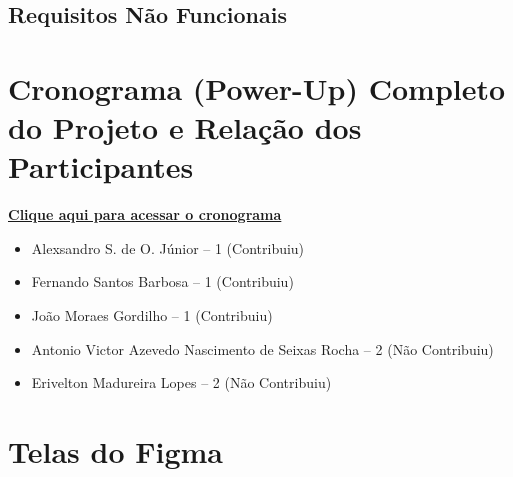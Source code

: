 \documentclass[12pt,oneside,a4paper,article]{abntex2}
\begin{document}
    \newpage
    \subsection{Requisitos Não Funcionais}
    
    
                                
    
    \newpage
    \section{Cronograma (Power-Up) Completo do Projeto e Relação dos Participantes}
    \href{https://trello.com/b/ibXrGxlH/trello-de-desenvolvimento}{\textbf{Clique aqui para acessar o cronograma}}
    \begin{itemize}
         \item Alexsandro S. de O. Júnior – 1 (Contribuiu)
        \item Fernando Santos Barbosa – 1 (Contribuiu)
        \item João Moraes Gordilho – 1 (Contribuiu)
        \item Antonio Victor Azevedo Nascimento de Seixas Rocha – 2 (Não Contribuiu)
        \item Erivelton Madureira Lopes – 2 (Não Contribuiu)
    \end{itemize}
    \vspace{12mm}

    \section{Telas do Figma}         
    \vspace{12mm}
\end{document}
